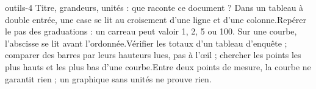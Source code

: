 \begin{blocEdition}{outils-4}
Titre, grandeurs, unités : que raconte ce document ? Dans un tableau à double entrée, une case se lit au croisement d’une ligne et d’une colonne.Repérer le pas des graduations : un carreau peut valoir 1, 2, 5 ou 100. Sur une courbe, l’abscisse se lit avant l’ordonnée.Vérifier les totaux d’un tableau d’enquête ; comparer des barres par leurs hauteurs lues, pas à l’œil ; chercher les points les plus hauts et les plus bas d’une courbe.Entre deux points de mesure, la courbe ne garantit rien ; un graphique sans unités ne prouve rien.
\end{blocEdition}
